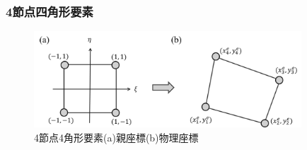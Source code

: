 \documentclass[dvipdfmx, 9pt, a4paper]{jsarticle}
\numberwithin{equation}{section}
\begin{document}
\subsubsection{4節点四角形要素}
\begin{figure}[t]
\begin{center}
\includegraphics[width = 10cm]{fig1_5.png}
\caption{4節点4角形要素(a)親座標(b)物理座標}
\end{center}
\end{figure}
\end{document}
